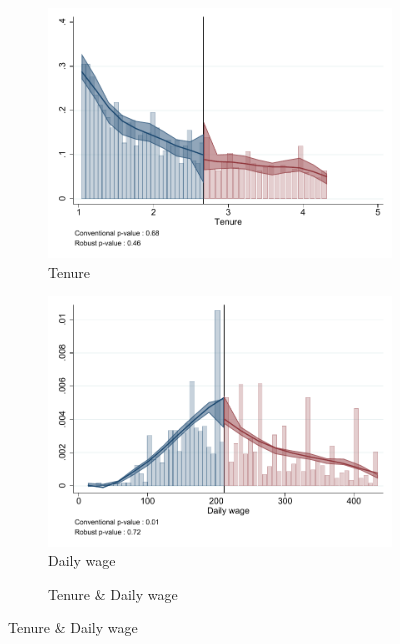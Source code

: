 \documentclass[oneside,11pt]{article}
\begin{document}
\begin{figure}[H]
     \caption{Manipulation test}
    \label{manipulation_test}
\begin{center}
\begin{subfigure}{0.49\textwidth}
\caption{Tenure}
        \includegraphics[width=\textwidth]{Figuras/mtp_tenure.pdf}
    \end{subfigure}
    \begin{subfigure}{0.49\textwidth}
\caption{Daily wage}
        \includegraphics[width=\textwidth]{Figuras/mtp_dw.pdf}
    \end{subfigure}
\begin{subfigure}{0.49\textwidth}
\caption{Tenure \& Daily wage}

\end{subfigure}
\end{center}
\end{figure}
\end{document}
